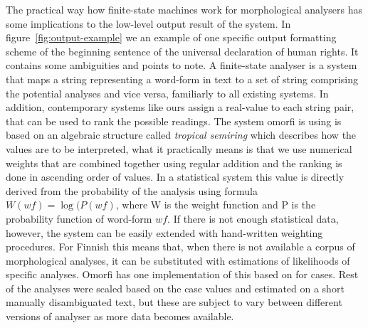 \documentclass[a4paper,12pt]{article}
\begin{document}
The practical way how finite-state machines work for morphological analysers
has some implications to the low-level output result of the system. In
figure~\ref{fig:output-example} we an example of one specific output formatting
scheme of the beginning sentence of the universal declaration of human rights.
It contains some ambiguities and points to note. A finite-state analyser is a
system that maps a string representing a word-form in text to a set of string
comprising the potential analyses and vice versa, familiarly to all existing
systems. In addition, contemporary systems like ours assign a real-value to
each string pair, that can be used to rank the possible readings.  The system
omorfi is using is based on an algebraic structure called \emph{tropical
semiring} which describes how the values are to be interpreted, what it
practically means is that we use numerical weights that are combined together
using regular addition and the ranking is done in ascending order of values.
In a statistical system this value is directly derived from the probability of
the analysis using formula $W(wf) = \log(P(wf)$, where W is the weight function
and P is the probability function of word-form $wf$. If there is not enough
statistical data, however, the system can be easily extended with hand-written
weighting procedures. For Finnish this means that, when there is not available
a corpus of morphological analyses, it can be substituted with estimations of
likelihoods of specific analyses. Omorfi has one implementation of this based
on \cite[§ 1227]{visk} for cases. Rest of the analyses were scaled based on the
case values and estimated on a short manually disambiguated text, but these are
subject to vary between different versions of analyser as more data becomes
available.
\end{document}
